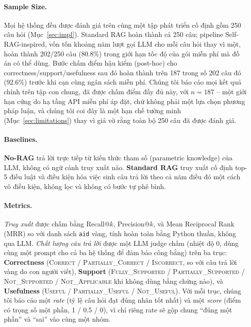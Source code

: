 \documentclass[11pt]{article}
\begin{document}
\paragraph{Sample Size.} Mọi hệ thống đều được đánh giá trên cùng một tập phát triển cố định gồm 250 câu hỏi (Mục~\ref{sec:impl}). Standard RAG hoàn thành cả 250 câu; pipeline Self-RAG-inspired, vốn tốn khoảng năm lượt gọi LLM cho mỗi câu hỏi thay vì một, hoàn thành 202/250 câu (80.8\%) trong giới hạn tốc độ của gói miễn phí mà đồ án có thể dùng. Bước chấm điểm hậu kiểm (post-hoc) cho correctness/support/usefulness sau đó hoàn thành trên 187 trong số 202 câu đó (92.6\%) trước khi cạn cùng ngân sách miễn phí. Chúng tôi báo cáo mọi kết quả chính trên tập con chung, đã được chấm điểm đầy đủ này, với \textbf{$n=187$} -- một giới hạn cứng do hạ tầng API miễn phí áp đặt, chứ không phải một lựa chọn phương pháp luận, và chúng tôi coi đây là một hạn chế tường minh (Mục~\ref{sec:limitations}) thay vì giả vờ rằng toàn bộ 250 câu đã được đánh giá.

\paragraph{Baselines.} \textbf{No-RAG} trả lời trực tiếp từ kiến thức tham số (parametric knowledge) của LLM, không có ngữ cảnh truy xuất nào. \textbf{Standard RAG} truy xuất cố định top-5 điều luật và điều kiện hóa việc sinh câu trả lời theo cả năm điều đó một cách vô điều kiện, không lọc và không có bước tự phê bình.

\paragraph{Metrics.} \emph{Truy xuất} được chấm bằng Recall@$k$, Precision@$k$, và Mean Reciprocal Rank (MRR) so với danh sách \texttt{aid} vàng, tính hoàn toàn bằng Python thuần, không qua LLM. \emph{Chất lượng câu trả lời} được một LLM judge chấm (nhiệt độ 0, dùng cùng một prompt cho cả ba hệ thống để đảm bảo công bằng) trên ba trục: \textbf{Correctness} (\textsc{Correct} / \textsc{Partially\_Correct} / \textsc{Incorrect}, so với câu trả lời vàng do con người viết), \textbf{Support} (\textsc{Fully\_Supported} / \textsc{Partially\_Supported} / \textsc{Not\_Supported} / \textsc{Not\_Applicable} khi không dùng bằng chứng nào), và \textbf{Usefulness} (\textsc{Useful} / \textsc{Partially\_Useful} / \textsc{Not\_Useful}). Với mỗi trục, chúng tôi báo cáo một \emph{rate} (tỷ lệ câu hỏi đạt đúng nhãn tốt nhất) và một \emph{score} (điểm có trọng số một phần, 1 / 0.5 / 0), vì chỉ riêng rate sẽ gộp chung ``đúng một phần'' và ``sai'' vào cùng một nhóm.
\end{document}
